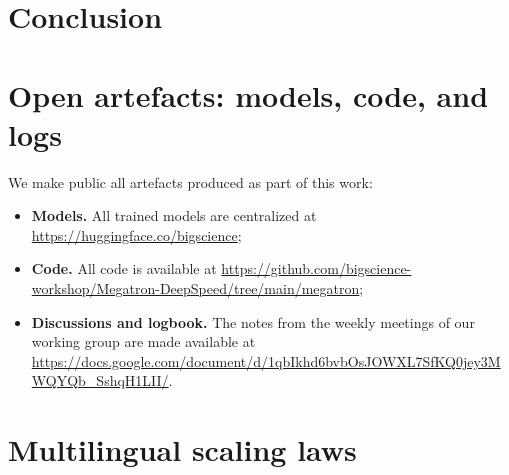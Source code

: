 \documentclass[11pt]{article}
\newcommand{\todo}[1]{\textbf{\textcolor{red}{#1}}}
\begin{document}
 
 
\section{Conclusion}

 





\newpage


\appendix
\onecolumn

\section{Open artefacts: models, code, and logs}
\label{sec:artefacts}
We make public all artefacts produced as part of this work:
\begin{itemize}
    \item \textbf{Models.} All trained models are centralized at \url{https://huggingface.co/bigscience};
    \item \textbf{Code.} All code is available at \url{https://github.com/bigscience-workshop/Megatron-DeepSpeed/tree/main/megatron};
    \item \textbf{Discussions and logbook.} The notes from the weekly meetings of our working group are made available at \url{https://docs.google.com/document/d/1qbIkhd6bvbOsJOWXL7SfKQ0jey3MWQYQb_SshqH1LII/}.
\end{itemize}

\section{Multilingual scaling laws}
\label{sec:multilingualscalinglaws}
\end{document}
